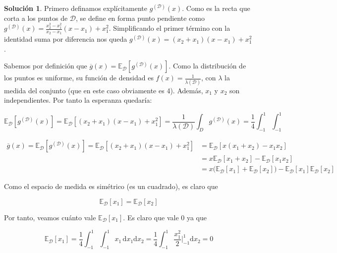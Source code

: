 \documentclass[a4paper, 11pt]{article}
\theoremstyle{definition}
\newtheorem*{solucion}{Solución}
\begin{document}
  \begin{solucion}
    Primero definamos explícitamente $g^{(\mathcal{D})}(x)$. Como es la recta que corta a los puntos de $\mathcal{D}$, se define en forma punto pendiente como $g^{(\mathcal{D})}(x) = \frac{x_2^2-x_1^2}{x_2-x_1}(x-x_1) + x_1^2$. Simplificando el primer término con la identidad suma por diferencia nos queda $g^{(\mathcal{D})}(x) = (x_2+x_1)(x-x_1) + x_1^2$.

    Sabemos por definición que $\overline{g}(x) = \mathbb{E}_\mathcal{D}\left[ g^{(\mathcal{D})}(x) \right]$. Como la distribución de los puntos es uniforme, su función de densidad es $f(x) = \frac{1}{\lambda(\mathcal{D})}$, con $\lambda$ la medida del conjunto (que en este caso obviamente es 4). Además, $x_1$ y $x_2$ son independientes. Por tanto la esperanza quedaría:

    $$ \mathbb{E}_\mathcal{D}\left[ g^{(\mathcal{D})}(x) \right] = \mathbb{E}_\mathcal{D}\left[ (x_2+x_1)(x-x_1) + x_1^2 \right] = \frac{1}{\lambda(\mathcal{D})} \int_D g^{(\mathcal{D})}(x) = \frac{1}{4}  \int_{-1}^1 \int_{-1}^1 $$

    \begin{equation*}
      \begin{split}
        \overline{g}(x) = \mathbb{E}_\mathcal{D}\left[ g^{(\mathcal{D})}(x) \right] = \mathbb{E}_\mathcal{D}\left[ (x_2+x_1)(x-x_1) + x_1^2 \right] &=            \mathbb{E}_\mathcal{D}\left[ x(x_1+x_2) - x_1x_2 \right] \\
        &= x\mathbb{E}_\mathcal{D}\left[ x_1+x_2 \right] - \mathbb{E}_\mathcal{D}\left[ x_1x_2 \right] \\
        &= x\big( \mathbb{E}_\mathcal{D}\left[ x_1 \right] + \mathbb{E}_\mathcal{D}\left[ x_2 \right] \big) - \mathbb{E}_\mathcal{D}\left[ x_1 \right] \mathbb{E}_\mathcal{D}\left[ x_2 \right]
      \end{split}
    \end{equation*}

    Como el espacio de medida es simétrico (es un cuadrado), es claro que

    $$\mathbb{E}_\mathcal{D}\left[ x_1 \right] = \mathbb{E}_\mathcal{D}\left[ x_2 \right]$$

    Por tanto, veamos cuánto vale $\mathbb{E}_\mathcal{D}\left[ x_1 \right]$. Es claro que vale 0 ya que

    $$ \mathbb{E}_\mathcal{D}\left[ x_1 \right] = \frac{1}{4}\int_{-1}^1 \int_{-1}^1 \! x_1 \, \mathrm{d}x_1 \mathrm{d}x_2 = \frac{1}{4} \int_{-1}^1 \frac{x_1^2}{2} \biggr\rvert_{-1}^1 \mathrm{d}x_2 = 0 $$


\end{solucion}
\end{document}
